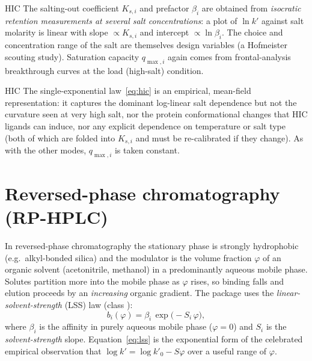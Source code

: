 \begin{databox}{HIC}
The salting-out coefficient $K_{s,i}$ and prefactor $\beta_i$ are obtained from
\emph{isocratic retention measurements at several salt concentrations}: a plot of
$\ln k'$ against salt molarity is linear with slope $\propto K_{s,i}$ and
intercept $\propto \ln\beta_i$. The choice and concentration range of the salt
are themselves design variables (a Hofmeister scouting study). Saturation
capacity $q_{\max,i}$ again comes from frontal-analysis breakthrough curves at
the load (high-salt) condition.
\end{databox}

\begin{limitbox}{HIC}
The single-exponential law~\eqref{eq:hic} is an empirical, mean-field
representation: it captures the dominant log-linear salt dependence but not the
curvature seen at very high salt, nor the protein conformational changes that HIC
ligands can induce, nor any explicit dependence on temperature or salt type
(both of which are folded into $K_{s,i}$ and must be re-calibrated if they
change). As with the other modes, $q_{\max,i}$ is taken constant.
\end{limitbox}

\section{Reversed-phase chromatography (RP-HPLC)}
\label{sec:rp}

In reversed-phase chromatography the stationary phase is strongly hydrophobic
(e.g.\ alkyl-bonded silica) and the modulator is the volume fraction $\varphi$ of
an organic solvent (acetonitrile, methanol) in a predominantly aqueous mobile
phase. Solutes partition more into the mobile phase as $\varphi$ rises, so
binding falls and elution proceeds by an \emph{increasing} organic gradient. The
package uses the \emph{linear-solvent-strength} (LSS) law (class
):
%
\begin{equation}
b_i(\varphi) = \beta_i \, \exp\!\bigl(-S_i\,\varphi\bigr),
\label{eq:lss}
\end{equation}
%
where $\beta_i$ is the affinity in purely aqueous mobile phase ($\varphi=0$) and
$S_i$ is the \emph{solvent-strength} slope. Equation~\eqref{eq:lss} is the
exponential form of the celebrated empirical observation that
$\log k' = \log k'_0 - S\varphi$ over a useful range of $\varphi$.

